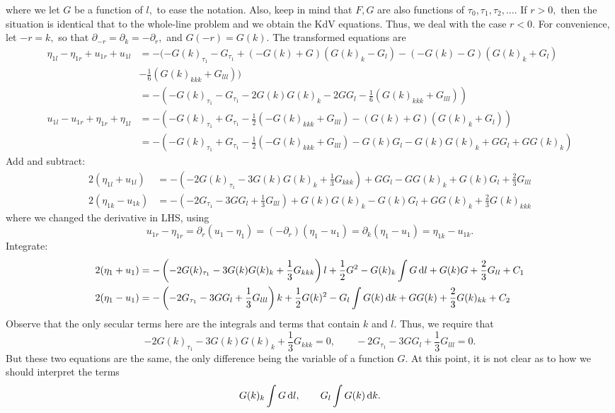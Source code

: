 \documentclass[10pt,reqno,oneside,a4paper]{article}
\begin{document}
where we let $G$ be a function of $l,$ to ease the notation. Also, keep in mind that $F,G$ are also functions of $\tau_0, \tau_1, \tau_2, \ldots.$ If $r > 0,$ then the situation is identical that to the whole-line problem and we obtain the KdV equations. Thus, we deal with the case $r<0.$ For convenience, let $-r = k,$ so that $\partial_{-r} = \partial_k = - \partial_r,$ and $G(-r)= G(k).$ The transformed equations are
\begin{align*}
\eta_{1l} - \eta_{1r} + u_{1r} + u_{1l} &= - (-G(k)_{\tau_1} - G_{\tau_1} + (-G(k) + G)(G(k)_k - G_l) - (-G(k) - G)(G(k)_k + G_l)\\
&- \frac{1}{6}(G(k)_{kkk}+G_{lll})) \\
&= -(-G(k)_{\tau_1} - G_{\tau_1} - 2G(k)G(k)_k - 2G G_l - \frac{1}{6}(G(k)_{kkk}+G_{lll})) \\
u_{1l} - u_{1r} + \eta_{1r} + \eta_{1l}  &= - (-G(k)_{\tau_1} + G_{\tau_1} - \frac{1}{2}(-G(k)_{kkk} + G_{lll}) - (G(k) + G)(G(k)_k+G_l)) \\
&=  - (-G(k)_{\tau_1} + G_{\tau_1} - \frac{1}{2}(-G(k)_{kkk} + G_{lll}) - G(k)G_l - G(k)G(k)_k + G G_l+GG(k)_k)
\end{align*}
Add and subtract:
\begin{align*}
2(\eta_{1l} + u_{1l}) &= -\left( -2G(k)_{\tau_1} - 3 G(k)G(k)_k + \frac{1}{3}G_{kkk} \right) + GG_l  - G G(k)_k + G(k)G_l + \frac{2}{3} G_{lll} \\
2(\eta_{1k} - u_{1k}) &=  - \left(-2G_{\tau_1} - 3GG_l + \frac{1}{3}G_{lll}\right) + G(k)G(k)_k - G(k)G_l + G G(k)_k + \frac{2}{3}G(k)_{kkk} 
\end{align*}
where we changed the derivative in LHS, using
\[ 
u_{1r} - \eta_{1r} = \partial_r (u_1 - \eta_1) = (-\partial_r)(\eta_1 - u_1) = \partial_k(\eta_1 - u_1) = \eta_{1k} - u_{1k}.
\]
Integrate:
\begin{align*}
2(\eta_{1} + u_{1}) &= -\left(-2G(k)_{\tau_1} - 3 G(k)G(k)_k + \frac{1}{3}G_{kkk}\right)l + \frac{1}{2}G^2  - G(k)_k \int G \,\mathrm{d} l + G(k)G + \frac{2}{3} G_{ll} + C_1 \\
2(\eta_{1} - u_{1}) &=  - \left(-2G_{\tau_1} - 3GG_l + \frac{1}{3}G_{lll}\right)k + \frac{1}{2}G(k)^2 - G_l \int G(k) \,\mathrm{d} k +GG(k) + \frac{2}{3}G(k)_{kk} + C_2 
\end{align*}
Observe that the only secular terms here are the integrals and terms that contain $k$ and $l.$ Thus, we require that 
\[ 
-2G(k)_{\tau_1} - 3 G(k)G(k)_k + \frac{1}{3}G_{kkk} = 0, \qquad -2G_{\tau_1} - 3GG_l + \frac{1}{3}G_{lll} = 0.
\] 
But these two equations are the same, the only difference being the variable of a function $G.$ At this point, it is not clear as to how we should interpret the terms 
\[ G(k)_k \int G \,\mathrm{d} l,  \qquad G_l \int G(k) \,\mathrm{d} k. \]
\end{document}
